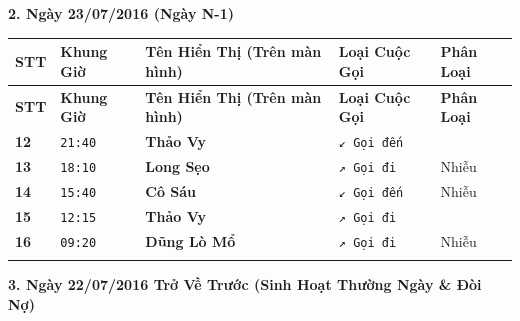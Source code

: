 \documentclass[12pt,a4paper]{article}
\begin{document}
\vspace{0.3cm}\noindent\textbf{\large 2. Ngày 23/07/2016 (Ngày N-1)}\\[0.15cm]



\vspace{0.2cm}
\begingroup
\small
\begin{xltabular}{\textwidth}{>{\hsize}X >{\hsize}X >{\hsize}X >{\hsize}X >{\hsize}X}
\toprule
\textbf{STT} & \textbf{Khung Giờ} & \textbf{Tên Hiển Thị (Trên màn hình)} & \textbf{Loại Cuộc Gọi} & \textbf{Phân Loại} \\
\midrule
\endfirsthead
\toprule
\textbf{STT} & \textbf{Khung Giờ} & \textbf{Tên Hiển Thị (Trên màn hình)} & \textbf{Loại Cuộc Gọi} & \textbf{Phân Loại} \\
\midrule
\endhead
\bottomrule
\endfoot
\textbf{12} & \texttt{21:40} & \textbf{Thảo Vy} & \texttt{↙ Gọi đến} &  \\ \addlinespace[4pt]
\textbf{13} & \texttt{18:10} & \textbf{Long Sẹo} & \texttt{↗ Gọi đi} & Nhiễu \\ \addlinespace[4pt]
\textbf{14} & \texttt{15:40} & \textbf{Cô Sáu} & \texttt{↙ Gọi đến} & Nhiễu \\ \addlinespace[4pt]
\textbf{15} & \texttt{12:15} & \textbf{Thảo Vy} & \texttt{↗ Gọi đi} &  \\ \addlinespace[4pt]
\textbf{16} & \texttt{09:20} & \textbf{Dũng Lò Mổ} & \texttt{↗ Gọi đi} & Nhiễu \\ \addlinespace[4pt]
\end{xltabular}
\endgroup

\vspace{0.2cm}


\vspace{0.3cm}\noindent\textbf{\large 3. Ngày 22/07/2016 Trở Về Trước (Sinh Hoạt Thường Ngày \& Đòi Nợ)}\\[0.15cm]
\end{document}

